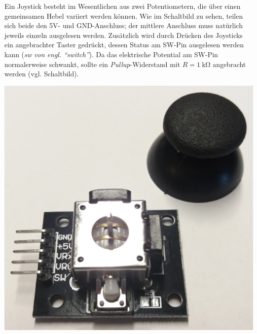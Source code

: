 \bigskip
\begin{minipage}{0.73\textwidth}
	Ein Joystick besteht im Wesentlichen aus zwei Potentiometern, die über einen gemeinsamen Hebel variiert werden können. Wie im Schaltbild zu sehen, teilen sich beide den 5V- und GND-Anschluss; der mittlere Anschluss muss natürlich jeweils einzeln ausgelesen werden. Zusätzlich wird durch Drücken des Joysticks ein angebrachter Taster gedrückt, dessen Status am SW-Pin ausgelesen werden kann (\emph{sw von engl. \enquote{switch}}). Da das elektrische Potential am SW-Pin normalerweise schwankt, sollte ein \emph{Pullup}-Widerstand mit $R=\SI{1}{\kilo\ohm}$ angebracht werden (vgl. Schaltbild).	
\end{minipage}
\hfill
\begin{minipage}{0.25\textwidth}
	\centering
	\includegraphics[width=\linewidth]{./pics/joystick.jpg}
\end{minipage}

